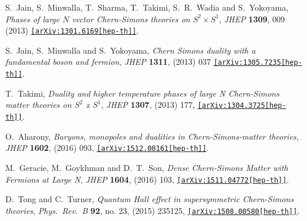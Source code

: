 \documentclass[12pt,a4paper]{article}
\begin{document}
\begin{thebibliography}{99}
  S.~Jain, S.~Minwalla, T.~Sharma, T.~Takimi, S.~R.~Wadia and S.~Yokoyama,
 {\it Phases of large $N$ vector Chern-Simons theories on $S^2 \times S^1$},
  {\it JHEP} {\bf 1309}, 009 (2013)
  \href{https://arxiv.org/abs/1301.6169}{\tt[arXiv:1301.6169[hep-th]]}.
  
  S.~Jain, S.~Minwalla and S.~Yokoyama,
  {\it Chern Simons duality with a fundamental boson and fermion},
  {\it JHEP} {\bf 1311}, (2013) 037 
   \href{https://arxiv.org/abs/1305.7235}{\tt[arXiv:1305.7235[hep-th]]}.

  
  T.~Takimi,
 {\it Duality and higher temperature phases of large N Chern-Simons matter theories on $S^2$ x $S^1$},
{\it JHEP} {\bf 1307}, (2013) 177,  
  \href{https://arxiv.org/abs/1304.3725}{\tt[arXiv:1304.3725[hep-th]]}.

  O.~Aharony,
  {\it Baryons, monopoles and dualities in Chern-Simons-matter theories}, 
  {\it JHEP} {\bf 1602},  (2016) 093, 
  \href{https://arxiv.org/abs/1512.00161}{\tt[arXiv:1512.00161[hep-th]]}.

  M.~Geracie, M.~Goykhman and D.~T.~Son,
  {\it Dense Chern-Simons Matter with Fermions at Large N},
  {\it JHEP} {\bf 1604}, (2016) 103, 
  \href{https://arxiv.org/abs/1511.04772}{\tt[arXiv:1511.04772[hep-th]]}.




  D.~Tong and C.~Turner,
  {\it Quantum Hall effect in supersymmetric Chern-Simons theories},
  {\it Phys.\ Rev.\ B} {\bf 92}, no. 23,  (2015) 235125,
  \href{https://arxiv.org/abs/1508.00580}{\tt[arXiv:1508.00580[hep-th]]}.



\end{thebibliography}
\end{document}
